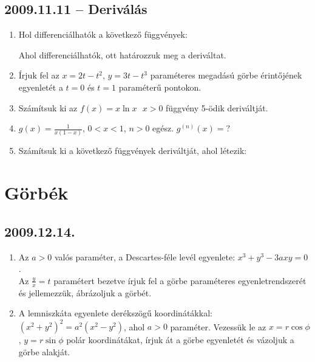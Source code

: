 \subsection*{2009.11.11 -- Deriválás}
\begin{enumerate}
\item Hol differenciálhatók a következő függvények: 
	Ahol differenciálhatók, ott határozzuk meg a deriváltat.
\item Írjuk fel az $x=2t-t^2$, $y=3t-t^3$ paraméteres megadású görbe érintőjének egyenletét a $t=0$ és $t=1$ paraméterű pontokon.
\item Számítsuk ki az $f(x)=x \ln x~~~x>0$  függvény 5-ödik deriváltját.
\item $g(x)=\frac{1}{x(1-x)}$, $0<x<1$, $n>0$ egész. $g^{(n)}(x)=?$
\item Számítsuk ki a következő függvények deriváltját, ahol létezik: 
\end{enumerate}




\section{Görbék}
\subsection*{2009.12.14.}
\begin{enumerate}
\item Az $a>0$ valós paraméter, a Descartes-féle levél egyenlete: $x^3+y^3-3axy=0$.
\\ Az $\frac{y}{x}=t$ paramétert bezetve írjuk fel a görbe paraméteres egyenletrendszerét és jellemezzük, ábrázoljuk a görbét.
\item A lemniszkáta egyenlete derékszögű koordinátákkal: $(x^2+y^2)^2=a^2(x^2-y^2)$, ahol $a>0$ paraméter. Vezessük le az $x=r\cos\phi$, $y=r\sin\phi$ polár koordinátákat, írjuk át a görbe egyenletét és vázoljuk a görbe alakját.
\end{enumerate}

